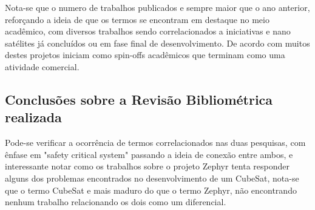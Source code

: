 Nota-se que o numero de trabalhos publicados e sempre maior que o ano anterior, reforçando a ideia de 
que os termos se encontram em destaque no meio acadêmico, com diversos trabalhos sendo correlacionados 
a iniciativas e nano satélites já concluídos ou em fase final de desenvolvimento. De acordo com \cite{Woellert2011} 
muitos destes projetos iniciam como spin-offs acadêmicos que terminam como uma atividade comercial.


\subsection{Conclusões sobre a Revisão Bibliométrica realizada}
Pode-se verificar a ocorrência de termos correlacionados nas duas pesquisas, com ênfase em 
"safety critical system" passando a ideia de conexão entre ambos, e interessante notar como 
os trabalhos sobre o projeto Zephyr tenta responder alguns dos problemas encontrados no 
desenvolvimento de um CubeSat, nota-se que o termo CubeSat e mais maduro do que o termo 
Zephyr, não encontrando nenhum trabalho relacionando os dois como um diferencial. 


